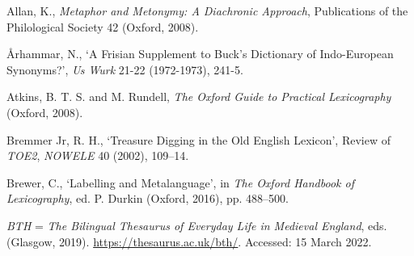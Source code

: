 \begin{list}{}%
{\leftmargin=0.5in \itemindent=-0.5in}
\setlength{\itemsep}{0pt}
\setlength{\parskip}{0pt}
\setlength{\parsep}{0pt}




\item %
Allan, K., \textit{Metaphor and Metonymy: A Diachronic Approach}, Publications of the Philological Society 42 (Oxford, 2008).

\item %
Århammar, N., `A Frisian Supplement to Buck's Dictionary of Indo-European Synonyms?', \textit{Us Wurk} 21-22 (1972-1973), 241-5.

\item %
Atkins, B. T. S. and M. Rundell, \textit{The Oxford Guide to Practical Lexicography} (Oxford, 2008).

\item %
Bremmer Jr, R. H., `Treasure Digging in the Old English Lexicon', Review of \textit{TOE2}, \textit{NOWELE} 40 (2002), 109–14.




\item %
Brewer, C., `Labelling and Metalanguage', in \textit{The Oxford Handbook of Lexicography}, ed. P. Durkin (Oxford, 2016), pp. 488–500.

\item %
\textit{BTH} = \textit{The Bilingual Thesaurus of Everyday Life in Medieval England}, eds. (Glasgow, 2019). \url{https://thesaurus.ac.uk/bth/}. Accessed: 15 March 2022.



\end{list}
